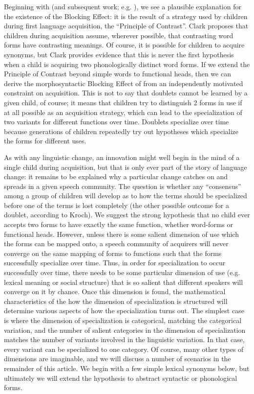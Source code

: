 Beginning with \citet{clark1987} (and subsequent work; e.g. \citealt{clark1990}), we see a plausible explanation for the existence of the Blocking Effect: it is the result of a strategy used by children during first language acquisition, the ``Principle of Contrast''.
Clark proposes that children during acquisition assume, wherever possible, that contrasting word forms have contrasting meanings.
Of course, it is possible for children to acquire synonyms, but Clark provides evidence that this is never the first hypothesis when a child is acquiring two phonologically distinct word forms.
If we extend the Principle of Contrast beyond simple words to functional heads, then we can derive the morphosyntactic Blocking Effect of \citet{kroch1994} from an independently motivated constraint on acquisition.
This is not to say that doublets cannot be learned by a given child, of course; it means that children try to distinguish 2 forms in use if at all possible as an acquisition strategy, which can lead to the specialization of two variants for different functions over time.
Doublets specialize over time because generations of children repeatedly try out hypotheses which specialize the forms for different uses.

As with any linguistic change, an innovation might well begin in the mind of a single child during acquisition, but that is only ever part of the story of language change: it remains to be explained why a particular change catches on and spreads in a given speech community.
The question is whether any ``consensus'' among a group of children will develop as to how the terms should be specialized before one of the terms is lost completely (the other possible outcome for a doublet, according to Kroch).
We suggest the strong hypothesis that no child ever accepts two forms to have exactly the same function, whether word-forms or functional heads.
However, unless there is some salient dimension of use which the forms can be mapped onto, a speech community of acquirers will never converge on the same mapping of forms to functions such that the forms successfully specialize over time.
Thus, in order for specialization to occur successfully over time, there needs to be some particular dimension of use (e.g. lexical meaning or social structure) that is so salient that different speakers will converge on it by chance.
Once this dimension is found, the mathematical characteristics of the how the dimension of specialization is structured will determine various aspects of how the specialization turns out.
The simplest case is where the dimension of specialization is categorical, matching the categorical variation, and the number of salient categories in the dimension of specialization matches the number of variants involved in the linguistic variation. 
In that case, every variant can be specialized to one category.
Of course, many other types of dimensions are imaginable, and we will discuss a number of scenarios in the remainder of this article.
We begin with a few simple lexical synonyms below, but ultimately we will extend the hypothesis to abstract syntactic or phonological forms.


